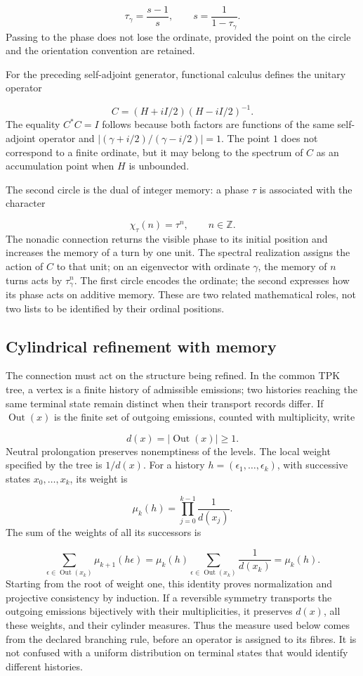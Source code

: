 \[
\tau_\gamma=\frac{s-1}{s},\qquad s=\frac1{1-\tau_\gamma}.
\]
Passing to the phase does not lose the ordinate, provided the point on the circle and the orientation convention are retained.

For the preceding self-adjoint generator, functional calculus defines the unitary operator

\[
C=(H+iI/2)(H-iI/2)^{-1}.
\]
The equality \(C^*C=I\) follows because both factors are functions of the same self-adjoint operator and \(|(\gamma+i/2)/(\gamma-i/2)|=1\). The point \(1\) does not correspond to a finite ordinate, but it may belong to the spectrum of \(C\) as an accumulation point when \(H\) is unbounded.

The second circle is the dual of integer memory: a phase \(\tau\) is associated with the character

\[
\chi_\tau(n)=\tau^n,\qquad n\in\mathbb Z.
\]
The nonadic connection returns the visible phase to its initial position and increases the memory of a turn by one unit. The spectral realization assigns the action of \(C\) to that unit; on an eigenvector with ordinate \(\gamma\), the memory of \(n\) turns acts by \(\tau_\gamma^n\). The first circle encodes the ordinate; the second expresses how its phase acts on additive memory. These are two related mathematical roles, not two lists to be identified by their ordinal positions.

\subsection{Cylindrical refinement with memory}
\label{rz:refinamiento}
The connection must act on the structure being refined. In the common TPK tree, a vertex is a finite history of admissible emissions; two histories reaching the same terminal state remain distinct when their transport records differ. If \(\operatorname{Out}(x)\) is the finite set of outgoing emissions, counted with multiplicity, write

\[
d(x)=|\operatorname{Out}(x)|\geq1.
\]
Neutral prolongation preserves nonemptiness of the levels. The local weight specified by the tree is \(1/d(x)\). For a history \(h=(\epsilon_1,\ldots,\epsilon_k)\), with successive states \(x_0,\ldots,x_k\), its weight is

\[
\mu_k(h)=\prod_{j=0}^{k-1}\frac1{d(x_j)}.
\]
The sum of the weights of all its successors is

\[
\sum_{\epsilon\in\operatorname{Out}(x_k)}
\mu_{k+1}(h\epsilon)
=\mu_k(h)\sum_{\epsilon\in\operatorname{Out}(x_k)}\frac1{d(x_k)}
=\mu_k(h).
\]
Starting from the root of weight one, this identity proves normalization and projective consistency by induction. If a reversible symmetry transports the outgoing emissions bijectively with their multiplicities, it preserves \(d(x)\), all these weights, and their cylinder measures. Thus the measure used below comes from the declared branching rule, before an operator is assigned to its fibres. It is not confused with a uniform distribution on terminal states that would identify different histories.

